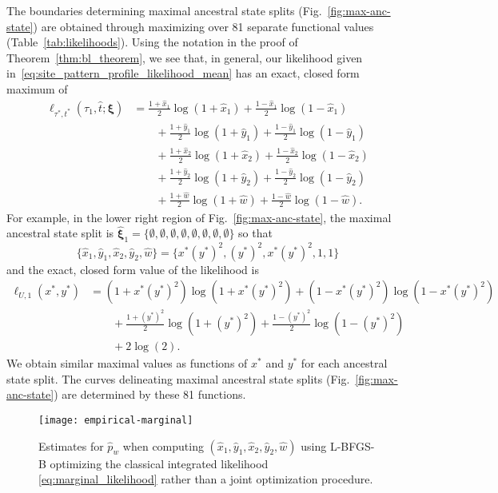 The boundaries determining maximal ancestral state splits (Fig.~\ref{fig:max-anc-state}) are obtained through maximizing over 81 separate functional values (Table~\ref{tab:likelihoods}).
Using the notation in the proof of Theorem~\ref{thm:bl_theorem}, we see that, in general, our likelihood given in~\eqref{eq:site_pattern_profile_likelihood_mean} has an exact, closed form maximum of
\begin{align}
\ell_{\tau^*,t^*}(\tau_1, \hat{t}; \boldsymbol\xi) &= \frac{1+\hat{x}_1}{2}\log(1+\hat{x}_1) + \frac{1-\hat{x}_1}{2}\log(1-\hat{x}_1)\nonumber\\
&\qquad + \frac{1+\hat{y}_1}{2}\log(1+\hat{y}_1) + \frac{1-\hat{y}_1}{2}\log(1-\hat{y}_1)\nonumber\\
&\qquad + \frac{1+\hat{x}_2}{2}\log(1+\hat{x}_2) + \frac{1-\hat{x}_2}{2}\log(1-\hat{x}_2)\nonumber\\
&\qquad + \frac{1+\hat{y}_2}{2}\log(1+\hat{y}_2) + \frac{1-\hat{y}_2}{2}\log(1-\hat{y}_2)\nonumber\\
&\qquad + \frac{1+\hat{w}}{2}\log(1+\hat{w}) + \frac{1-\hat{w}}{2}\log(1-\hat{w}).
\end{align}
For example, in the lower right region of Fig.~\ref{fig:max-anc-state}, the maximal ancestral state split is $\hat{\boldsymbol\xi}_1 = \{\emptyset,\emptyset,\emptyset,\emptyset,\emptyset,\emptyset,\emptyset,\emptyset\}$ so that
\[
\{\hat{x}_1,\hat{y}_1,\hat{x}_2,\hat{y}_2,\hat{w}\} = \{x^*(y^*)^2,(y^*)^2,x^*(y^*)^2,1,1\}
\]
and the exact, closed form value of the likelihood is
\begin{align}
\ell_{U,1}(x^*,y^*) &= (1+x^*(y^*)^2)\log(1+x^*(y^*)^2) + (1-x^*(y^*)^2)\log(1-x^*(y^*)^2)\nonumber\\
&\qquad + \frac{1+(y^*)^2}{2}\log(1+(y^*)^2) + \frac{1-(y^*)^2}{2}\log(1-(y^*)^2)\nonumber\\
&\qquad + 2\log(2).
\end{align}
We obtain similar maximal values as functions of $x^*$ and $y^*$ for each ancestral state split.
The curves delineating maximal ancestral state splits (Fig.~\ref{fig:max-anc-state}) are determined by these 81 functions.


\begin{figure}
\centering
\texttt{[image: empirical-marginal]}
\caption{
    Estimates for $\hat{p}_w$ when computing $(\hat{x}_1, \hat{y}_1, \hat{x}_2, \hat{y}_2, \hat{w})$ using L-BFGS-B optimizing the classical integrated likelihood \eqref{eq:marginal_likelihood} rather than a joint optimization procedure.
}
\label{fig:bl-general-marginal}
\end{figure}
